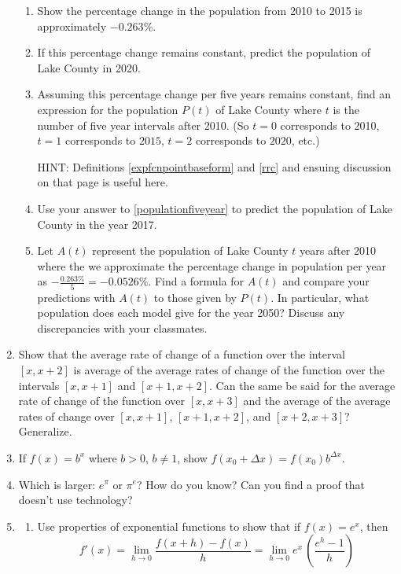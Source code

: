 \begin{enumerate}
\begin{enumerate}
\item  Show the percentage change in the population from 2010 to 2015 is approximately $-0.263 \%$.

\item  If this percentage change remains constant, predict the population of Lake County in 2020.

\item  \label{populationfiveyear} Assuming this percentage change per five years remains constant, find an expression for the population $P(t)$ of Lake County where $t$ is the number of five year intervals after 2010.  (So $t = 0$ corresponds to 2010, $t = 1$ corresponds to $2015$, $t = 2$ corresponds to $2020$, etc.)

HINT:  Definitions \ref{expfcnpointbaseform} and \ref{rrc} and ensuing discussion on that page is useful here.

\item  Use your answer to  \ref{populationfiveyear}  to predict the population of Lake County in the year 2017.  

\item  Let $A(t)$  represent the population of Lake County $t$ years after 2010 where the we approximate the percentage change in population per year as $-\frac{0.263 \%}{5} = -0.0526 \%$.    Find a formula for $A(t)$ and compare your predictions with $A(t)$ to those given by $P(t)$.  In particular, what population does each model give for the year 2050?  Discuss any discrepancies with your classmates.

\end{enumerate}


\item \label{averageofarc}  Show that the average rate of change of a function over the interval  $[x, x+2]$ is average of the average rates of change of the function over the intervals $[x,x+1]$ and $[x+1, x+2]$.  Can the same be said for the average rate of change of the function over $[x, x+3]$ and the average of the average rates of change over $[x, x+1]$, $[x+1, x+2]$, and $[x+2, x+3]$?  Generalize.

\item \label{exponentialchangeexercise}  If $f(x) = b^{x}$ where $b>0$, $b \neq 1$,  show $f(x_{0}+\Delta x) = f(x_{0}) b^{\Delta x}$.


\item Which is larger: $e^{\pi}$ or $\pi^{e}$?  How do you know?  Can you find a proof that doesn't use technology?


\item\label{derivativeofex} \begin{enumerate}  \item\label{diffquotex}  Use properties of exponential functions to show that if $f(x) = e^{x}$, then \[ f'(x) = \lim_{h \rightarrow 0} \frac{f(x+h) - f(x)}{h} = \lim_{h \rightarrow 0} e^{x} \, \left( \frac{e^{h} - 1}{h} \right)\]


\end{enumerate}
\end{enumerate}
